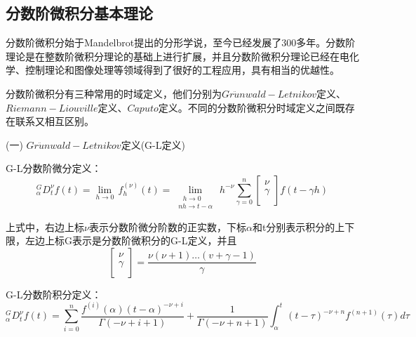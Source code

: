 \subsection{分数阶微积分基本理论}
分数阶微积分始于Mandelbrot提出的分形学说，至今已经发展了300多年。分数阶理论是在整数阶微积分理论的基础上进行扩展，并且分数阶微积分理论已经在电化学、控制理论和图像处理等领域得到了很好的工程应用，具有相当的优越性。
\begin{enumerate}
分数阶微积分有三种常用的时域定义，他们分别为$Gr\ddot{u}nwald-Letnikov$定义、$Riemann-Liouville$定义、$Caputo$定义。不同的分数阶微积分时域定义之间既存在联系又相互区别。

(一) $Gr\ddot{u}nwald-Letnikov$定义(G-L定义)

G-L分数阶微分定义：
\begin{equation}
{}_{\alpha }^{G}D_{t}^{\nu }f(t)=\underset{h\to 0}{\mathop{\lim }}\,f_{h}^{(\nu )}\left( t \right)=\underset{\begin{smallmatrix} 
 ~~~h\to 0 \\ 
 nh\to t-\alpha  
\end{smallmatrix}}{\mathop{\lim }}\,{{h}^{-\nu }}\sum\limits_{\gamma =0}^{n}{\left[ \begin{matrix}
   \nu   \\
   \gamma   \\
\end{matrix} \right]}f\left( t-\gamma h \right)
\end{equation}

上式中，右边上标$\nu $表示分数阶微分阶数的正实数，下标$\alpha $和t分别表示积分的上下限，左边上标G表示是分数阶微积分的G-L定义，并且
\begin{equation}
\left[ \begin{matrix}
   \nu   \\
   \gamma   \\
\end{matrix} \right]=\frac{\nu \left( \nu +1 \right)\ldots \left( v+\gamma -1 \right)}{\gamma }
\end{equation}

G-L分数阶积分定义：
\begin{equation}
{}_{\alpha }^{G}D_{t}^{\nu }f(t)=\sum\limits_{i=0}^{n}{\frac{{{f}^{\left( i \right)}}\left( \alpha  \right){{\left( t-\alpha  \right)}^{-\nu +i}}}{\Gamma \left( -\nu +i+1 \right)}+\frac{1}{\Gamma \left( -\nu +n+1 \right)}}\int_{\alpha }^{t}{{{\left( t-\tau  \right)}^{-\nu +n}}{{f}^{\left( n+1 \right)}}\left( \tau  \right)}d\tau 
\end{equation}


\end{enumerate}
